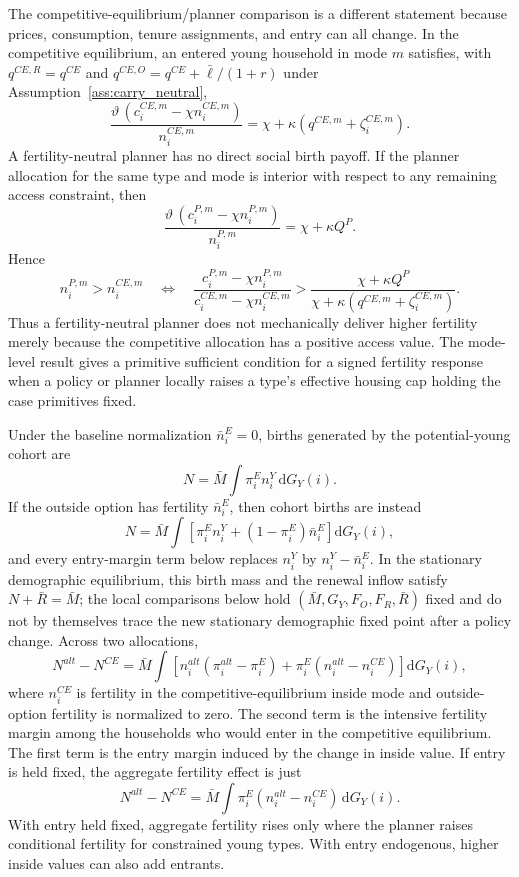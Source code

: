 \documentclass[11pt]{article}
\newcommand{\dd}{\mathrm d}
\newcommand{\1}{\mathbf 1}
\begin{document}
The competitive-equilibrium/planner comparison is a different statement because prices, consumption, tenure assignments, and entry can all change. In the competitive equilibrium, an entered young household in mode $m$ satisfies, with $q^{CE,R}=q^{CE}$ and $q^{CE,O}=q^{CE}+\bar\ell/(1+r)$ under Assumption~\ref{ass:carry_neutral},
\[
\frac{\vartheta\,(c_i^{CE,m}-\chi n_i^{CE,m})}{n_i^{CE,m}}
=
\chi+\kappa(q^{CE,m}+\zeta_i^{CE,m}).
\]
A fertility-neutral planner has no direct social birth payoff. If the planner allocation for the same type and mode is interior with respect to any remaining access constraint, then
\[
\frac{\vartheta\,(c_i^{P,m}-\chi n_i^{P,m})}{n_i^{P,m}}
=
\chi+\kappa Q^{P}.
\]
Hence
\[
n_i^{P,m}>n_i^{CE,m}
\quad\Longleftrightarrow\quad
\frac{c_i^{P,m}-\chi n_i^{P,m}}{c_i^{CE,m}-\chi n_i^{CE,m}}
>
\frac{\chi+\kappa Q^{P}}
{\chi+\kappa(q^{CE,m}+\zeta_i^{CE,m})}.
\]
Thus a fertility-neutral planner does not mechanically deliver higher fertility merely because the competitive allocation has a positive access value. The mode-level result gives a primitive sufficient condition for a signed fertility response when a policy or planner locally raises a type's effective housing cap holding the case primitives fixed.

Under the baseline normalization $\bar n_i^E=0$, births generated by the potential-young cohort are
\[
N
=
\bar M\int \pi_i^E n_i^Y\,\dd G_Y(i).
\]
If the outside option has fertility $\bar n_i^E$, then cohort births are instead
\[
N
=
\bar M\int
\left[
\pi_i^E n_i^Y+(1-\pi_i^E)\bar n_i^E
\right]\dd G_Y(i),
\]
and every entry-margin term below replaces $n_i^Y$ by $n_i^Y-\bar n_i^E$. In the stationary demographic equilibrium, this birth mass and the renewal inflow satisfy $N+\bar R=\bar M$; the local comparisons below hold $(\bar M,G_Y,F_O,F_R,\bar R)$ fixed and do not by themselves trace the new stationary demographic fixed point after a policy change.
Across two allocations,
\[
N^{alt}-N^{CE}
=
\bar M\int
\left[
n_i^{alt}(\pi_i^{alt}-\pi_i^E)
+
\pi_i^E(n_i^{alt}-n_i^{CE})
\right]\dd G_Y(i),
\]
where \(n_i^{CE}\) is fertility in the competitive-equilibrium inside mode and outside-option fertility is normalized to zero. The second term is the intensive fertility margin among the households who would enter in the competitive equilibrium. The first term is the entry margin induced by the change in inside value. If entry is held fixed, the aggregate fertility effect is just
\[
N^{alt}-N^{CE}
=
\bar M\int
\pi_i^E(n_i^{alt}-n_i^{CE})\,\dd G_Y(i).
\]
With entry held fixed, aggregate fertility rises only where the planner raises conditional fertility for constrained young types. With entry endogenous, higher inside values can also add entrants.
\end{document}
